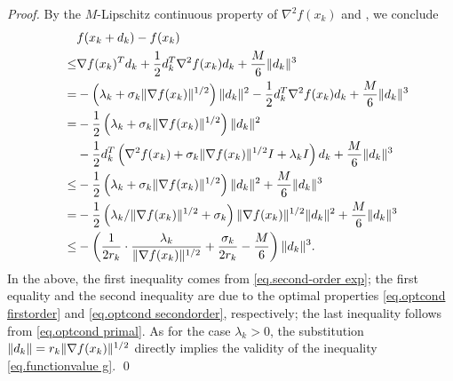 \begin{proof}
    By the $M$-Lipschitz continuous property of $\nabla^2 f(x_k)$ and , we conclude
    \begin{subequations}
        \begin{align}
        \notag
            &f(x_k+d_k) - f(x_k)\\
             \leq& \nabla f(x_k)^Td_k +\frac{1}{2}d_k^T\nabla ^2 f(x_k)d_k +\frac{M}{6}\|d_k\|^3 \notag                                                      \\
                                 =& - \left(\lambda_k +  \sigma_k\|\nabla f(x_k)\|^{1/2}\right) \|d_k\|^2 - \frac{1}{2}d_k^T\nabla ^2 f(x_k)d_k  + \frac{M}{6}\|d_k\|^3 \notag         \\
                                 =& - \frac{1}{2} \left(\lambda_k +  \sigma_k\|\nabla f(x_k)\|^{1/2}\right) \|d_k\|^2 \notag                                              \\
                                 \qquad&- \frac{1}{2}d_k^T\left(\nabla ^2 f(x_k) + \sigma_k \|\nabla f(x_k)\|^{1/2} I + \lambda_k I \right)d_k + \frac{M}{6}\|d_k\|^3 \notag           \\
                                 \le& - \frac{1}{2} \left(\lambda_k +  \sigma_k\|\nabla f(x_k)\|^{1/2}\right) \|d_k\|^2 + \frac{M}{6}\|d_k\|^3 \notag                     \\
                                 =& - \frac{1}{2} \left(\lambda_k/\|\nabla f(x_k)\|^{1/2} + \sigma_k\right)\|\nabla f(x_k)\|^{1/2} \|d_k\|^2 + \frac{M}{6}\|d_k\|^3 \notag                   \\
                                 \le& -\left(\frac{1}{2r_k} \cdot \frac{\lambda_k}{\|\nabla f(x_k)\|^{1/2}} + \frac{\sigma_k}{2r_k} - \frac{M}{6}\right)\|d_k\|^3. \notag
        \end{align}
    \end{subequations}
    In the above, the first inequality comes from \eqref{eq.second-order exp}; the first equality and the second inequality are due to the optimal properties \eqref{eq.optcond firstorder} and \eqref{eq.optcond secondorder}, respectively; the last inequality follows from \eqref{eq.optcond primal}. As for the case $\lambda_k > 0$, the substitution $\|d_k\| = r_k\|\nabla f(x_k)\|^{1/2}$ directly implies the validity of the inequality \eqref{eq.functionvalue g}.
\smartqed \qed \end{proof}

